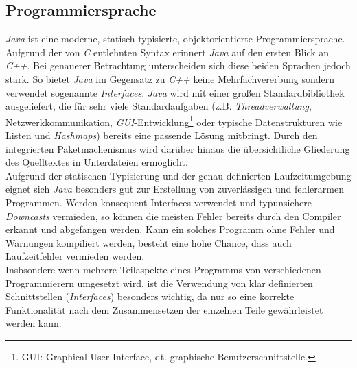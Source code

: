     \subsection{Programmiersprache}
        \emph{Java} ist eine moderne, statisch typisierte, objektorientierte Programmiersprache. Aufgrund der von 
        \emph{C} entlehnten Syntax erinnert \emph{Java} auf den ersten Blick an \emph{C++}. Bei genauerer 
        Betrachtung unterscheiden sich diese beiden Sprachen jedoch stark. So bietet \emph{Java} im Gegensatz zu 
        \emph{C++} keine Mehrfachvererbung sondern verwendet sogenannte \emph{Interfaces}. \emph{Java} wird mit einer 
        großen Standardbibliothek ausgeliefert, die für sehr viele Standardaufgaben
        (z.B. \emph{Threadverwaltung}, Netzwerkkommunikation, \emph{GUI}-Entwicklung\footnote{GUI: 
         Graphical-User-Interface, dt.  graphische Benutzerschnittstelle.} oder typische Datenstrukturen wie Listen und
         \emph{Hashmaps}) bereits eine
        passende Lösung mitbringt. Durch den integrierten Paketmachenismus wird darüber hinaus die übersichtliche
        Gliederung des Quelltextes in Unterdateien ermöglicht.\\
        Aufgrund der statischen Typisierung und der genau definierten Laufzeitumgebung eignet sich \emph{Java} besonders
        gut zur Erstellung von zuverlässigen und fehlerarmen Programmen. Werden konsequent Interfaces verwendet und
        typunsichere \emph{Downcasts} vermieden, so können die meisten Fehler bereits durch den Compiler erkannt und 
        abgefangen werden. Kann ein solches Programm ohne Fehler und Warnungen kompiliert werden, besteht eine hohe Chance,
        dass auch Laufzeitfehler vermieden werden.\\
        Insbsondere wenn mehrere Teilaspekte eines Programms von verschiedenen Programmierern umgesetzt wird, 
        ist die Verwendung von klar definierten Schnittstellen (\emph{Interfaces}) besonders wichtig, da nur so eine korrekte
        Funktionalität nach dem Zusammensetzen der einzelnen Teile gewährleistet werden kann.

